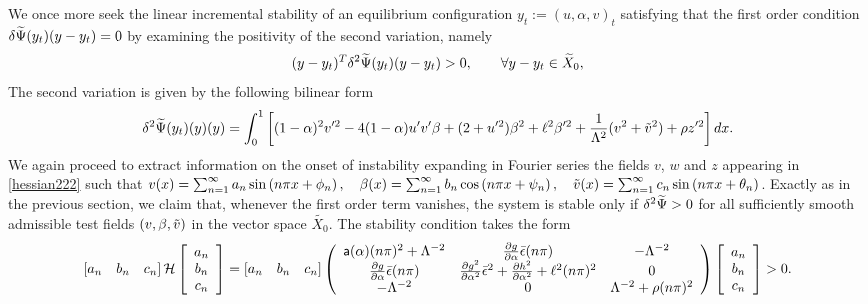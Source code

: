 We once more seek the linear incremental stability of an equilibrium configuration $y_t := (u, \alpha,  v)_t$ satisfying that the first order condition $\delta \widetilde\Psi(y_t)(y-y_t)=0$  by examining the positivity of the second variation, namely
\begin{equation*}
    (y-y_t)^T\delta^2 \widetilde\Psi(y_t)(y-y_t)>0, \qquad \forall y-y_t\in \widetilde X_0,
\end{equation*}The second variation is given by the following bilinear form 
\begin{equation}
\delta^2 \widetilde\Psi(y_t)(y)(y)=\int_0^1 \left[(1-\alpha)^2v'^2 
- 4(1-\alpha)u' v'\beta+(2+ u'^2)\beta^2+\ell^2\beta'^2 +\frac{1}{\Lambda^2}( v^2 + \tilde v^2)+\rho z'^2\right]dx.\label{hessian222}\end{equation}
We again proceed to extract information on the onset of instability expanding in Fourier series the fields $v$, $w$ and $z$ appearing in \eqref{hessian222} such that $v(x)=\sum_{n=1}^{\infty} a_{n} \sin \left(n \pi x+\phi_{n}\right), \quad \beta(x)=\sum_{n=1}^{\infty} b_{n} \cos \left(n \pi x+\psi_{n}\right),\quad \tilde v(x)=\sum_{n=1}^{\infty} c_{n} \sin \left(n \pi x+\theta_{n}\right)$. Exactly as in the previous section, we claim that, whenever the first order term vanishes, the system is stable only if $\delta^2 \widetilde\Psi
>0$ for all sufficiently smooth admissible test fields $(v, \beta, \tilde v)$ in the vector space $\widetilde{ X_0}$. The stability condition  takes the form
\begin{align}\left[ a_n \quad b_n \quad c_n  \right] \mathcal{H} \left[ \begin{array}{c} a_n \\ b_n  \\ c_n\end{array} \right]=\left[ a_n \quad b_n \quad c_n \right]\left(
\begin{array}{ccc}
\mathsf{a}(\alpha)(n\pi)^2+\Lambda^{-2}& \frac{\partial g}{\partial \alpha}\bar\epsilon(n\pi) &  -\Lambda^{-2} \\
\frac{\partial g}{\partial \alpha}\bar\epsilon(n\pi) & \frac{\partial g^2}{\partial \alpha^2}\bar\epsilon^2+ \frac{\partial h^2}{\partial \alpha^2}+\ell^2(n\pi)^2 & 0 \\
 -\Lambda^{-2} & 0 & \Lambda^{-2} +\rho (n\pi)^2\\
\end{array}
\right)\left[ \begin{array}{c} a_n \\ b_n \\c_n \end{array} \right]>0.\label{hessian3}\end{align}
